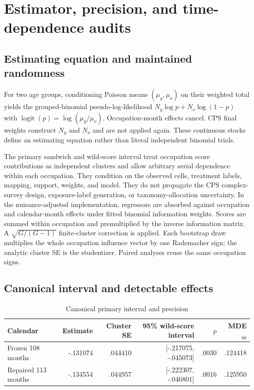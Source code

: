 \section{Estimator, precision, and time-dependence audits}\label{app:inference}

\subsection{Estimating equation and maintained randomness}

For two age groups, conditioning Poisson means $(\mu_y,\mu_o)$ on their weighted total yields the grouped-binomial pseudo-log-likelihood $N_y\log p+N_o\log(1-p)$ with $\operatorname{logit}(p)=\log(\mu_y/\mu_o)$. Occupation-month effects cancel. CPS final weights construct $N_y$ and $N_o$ and are not applied again. These continuous stocks define an estimating equation rather than literal independent binomial trials.

The primary sandwich and wild-score interval treat occupation score contributions as independent clusters and allow arbitrary serial dependence within each occupation. They condition on the observed cells, treatment labels, mapping, support, weights, and model. They do not propagate the CPS complex-survey design, exposure-label generation, or taxonomy-allocation uncertainty. In the nuisance-adjusted implementation, regressors are absorbed against occupation and calendar-month effects under fitted binomial information weights. Scores are summed within occupation and premultiplied by the inverse information matrix. A $\sqrt{G/(G-1)}$ finite-cluster correction is applied. Each bootstrap draw multiplies the whole occupation influence vector by one Rademacher sign; the analytic cluster SE is the studentizer. Paired analyses reuse the same occupation signs.

\subsection{Canonical interval and detectable effects}

\begin{table}[htbp]
\centering
\caption{Canonical primary interval and precision}\label{tab:appcanonical}
\small
\begin{tabular}{lrrrrr}
\toprule
Calendar & Estimate & Cluster SE & 95\% wild-score interval & $p$ & MDE$_{80}$ \\
\midrule
Frozen 108 months & -.131074 & .044410 & [-.217075, -.045073] & .0030 & .124418 \\
Repaired 113 months & -.134554 & .044957 & [-.222307, -.046801] & .0016 & .125950 \\
\bottomrule
\end{tabular}
\end{table}

